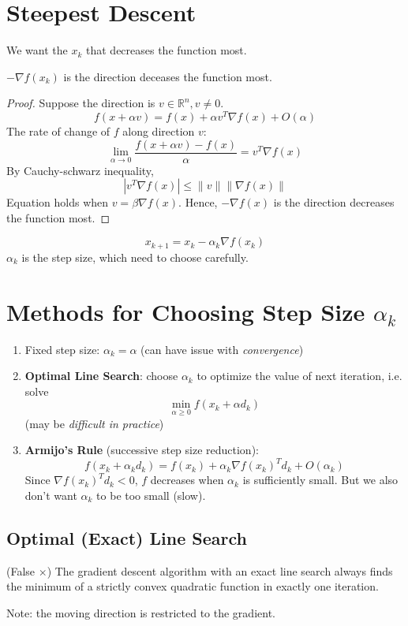 \documentclass[11pt]{elegantbook}
\begin{document}
\section{Steepest Descent}
We want the $x_k$ that decreases the function most.
\begin{proposition}
$-\nabla f(x_k)$ is the direction deceases the function most.
\end{proposition}
\begin{proof}
Suppose the direction is $v\in \mathbb{R}^n, v\neq 0$.
$$f(x+\alpha v)=f(x)+\alpha v^T \nabla f(x)+O(\alpha)$$
The rate of change of $f$ along direction $v$:
$$\lim_{\alpha \rightarrow 0}\frac{f(x+\alpha v)-f(x)}{\alpha}=v^T\nabla f(x)$$
By Cauchy-schwarz inequality,
$$|v^T\nabla f(x)|\leq \|v\|\|\nabla f(x)\|$$
Equation holds when $v=\beta \nabla f(x)$. Hence, $-\nabla f(x)$ is the direction decreases the function most.
\end{proof}

\begin{definition}
$$x_{k+1}=x_k-\alpha_k \nabla f(x_k)$$
$\alpha_k$ is the step size, which need to choose carefully.
\end{definition}

\section{Methods for Choosing Step Size $\alpha_k$}
\begin{enumerate}[(1):]
    \item Fixed step size: $\alpha_k=\alpha$ (can have issue with \textit{convergence})
    \item \textbf{Optimal Line Search}: choose $\alpha_k$ to optimize the value of next iteration, i.e. solve $$\min_{\alpha\geq 0}f(x_k+\alpha d_k)$$ (may be \textit{difficult in practice})
    \item \textbf{Armijo's Rule} (successive step size reduction):$$f(x_k+\alpha_k d_k)=f(x_k)+\alpha_k \nabla f(x_k)^T d_k+O(\alpha_k)$$
    Since $\nabla f(x_k)^T d_k<0$, $f$ decreases when $\alpha_k$ is sufficiently small. But we also don't want $\alpha_k$ to be too small (slow).
\end{enumerate}

\subsection{Optimal (Exact) Line Search}
\begin{example}
    (False $\times$) The gradient descent algorithm with an exact line search always finds the minimum of a strictly convex quadratic function in exactly one iteration.
\end{example}
Note: the moving direction is restricted to the gradient.
\end{document}
